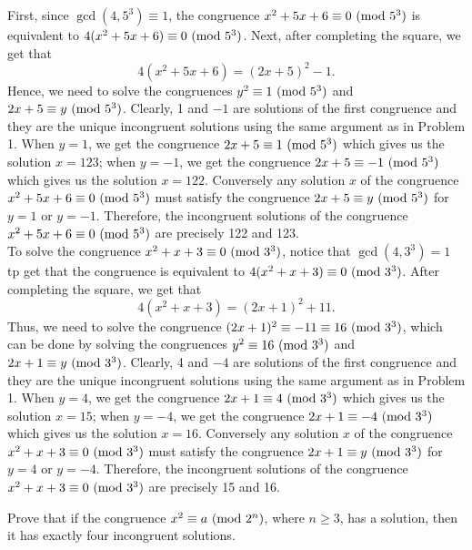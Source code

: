 \begin{solution}
    First, since $\gcd(4, 5^3) \equiv 1$, the congruence $x^2 + 5x + 6 \equiv 0 \ (\mathrm{mod}\ 5^3)$ is equivalent to $4(x^2 + 5x + 6) \equiv 0 \ (\mathrm{mod}\ 5^3)$. Next, after completing the square, we get that
    $$4(x^2 + 5x + 6) = (2x + 5)^2 - 1.$$
    Hence, we need to solve the congruences $y^2 \equiv 1 \ (\mathrm{mod}\ 5^3)$ and $2x + 5 \equiv y \ (\mathrm{mod}\ 5^3)$. Clearly, 1 and $-1$ are solutions of the first congruence and they are the unique incongruent solutions using the same argument as in Problem 1. When $y = 1$, we get the congruence $2x + 5\equiv 1 \ (\mathrm{mod}\ 5^3)$ which gives us the solution $x = 123$; when $y = -1$, we get the congruence $2x + 5 \equiv -1 \ (\mathrm{mod}\ 5^3)$ which gives us the solution $x = 122$. Conversely any solution $x$ of the congruence $x^2 + 5x + 6 \equiv 0 \ (\mathrm{mod}\ 5^3)$ must satisfy the congruence $2x + 5 \equiv y \ (\mathrm{mod}\ 5^3)$ for $y = 1$ or $y = -1$. Therefore, the incongruent solutions of the congruence $x^2 + 5x + 6 \equiv 0 \ (\mathrm{mod}\ 5^3)$ are precisely 122 and 123.\\
    
    To solve the congruence $x^2 + x + 3 \equiv 0 \ (\mathrm{mod}\ 3^3)$, notice that $\gcd(4,3^3) = 1$ tp get that the congruence is equivalent to $4(x^2 + x + 3) \equiv 0 \ (\mathrm{mod}\ 3^3)$. After completing the square, we get that
    $$4(x^2 + x + 3) = (2x + 1)^2 + 11.$$
    Thus, we need to solve the congruence $(2x + 1)^2 \equiv -11 \equiv 16 \ (\mathrm{mod}\ 3^3)$, which can be done by solving the congruences $y^2 \equiv 16 \ (\mathrm{mod}\ 3^3)$ and $2x + 1 \equiv y \ (\mathrm{mod}\ 3^3)$. Clearly, 4 and $-4$ are solutions of the first congruence and they are the unique incongruent solutions using the same argument as in Problem 1. When $y = 4$, we get the congruence $2x + 1\equiv 4 \ (\mathrm{mod}\ 3^3)$ which gives us the solution $x = 15$; when $y = -4$, we get the congruence $2x + 1 \equiv -4 \ (\mathrm{mod}\ 3^3)$ which gives us the solution $x = 16$. Conversely any solution $x$ of the congruence $x^2 + x + 3 \equiv 0 \ (\mathrm{mod}\ 3^3)$ must satisfy the congruence $2x + 1 \equiv y \ (\mathrm{mod}\ 3^3)$ for $y = 4$ or $y = -4$. Therefore, the incongruent solutions of the congruence $x^2 + x + 3 \equiv 0 \ (\mathrm{mod}\ 3^3)$ are precisely 15 and 16.\\
\end{solution}

\begin{exercise}
    Prove that if the congruence $x^2 \equiv a \ (\mathrm{mod}\ 2^n)$, where $n \geq 3$, has a solution, then it has exactly four incongruent solutions.  \\
\end{exercise}

